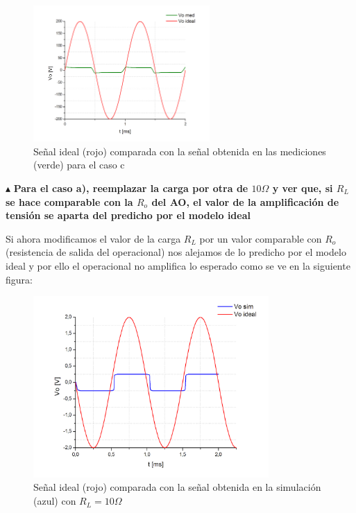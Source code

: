 \begin{figure}[H]
  \centering
      \includegraphics[width=0.6\textwidth]{gfxhernan/idealvsmedicionamplic.PNG}
  \caption{Señal ideal (rojo) comparada con la señal obtenida en las mediciones (verde) para el caso c}
  \label{fig:multipl_idealvsmed}
\end{figure}   

\noindent$\blacktriangle$\textbf{ Para el caso a), reemplazar la carga por otra de $10\Omega$ y ver que, si $R_{L}$ se hace comparable con la $R_{o}$ del AO, el valor de la amplificación de tensión se aparta del predicho por el modelo ideal}

Si ahora modificamos el valor de la carga $R_{L}$ por un valor comparable con $R_{o}$ (resistencia de salida del operacional) nos alejamos de lo predicho por el modelo ideal y por ello el operacional no amplifica lo esperado como se ve en la siguiente figura:

\begin{figure}[H]
  \centering
      \includegraphics[width=0.8\textwidth]{gfxhernan/ampli4.PNG}
  \caption{Señal ideal (rojo) comparada con la señal obtenida en la simulación (azul) con $R_{L} = 10 \Omega$}
\end{figure}

